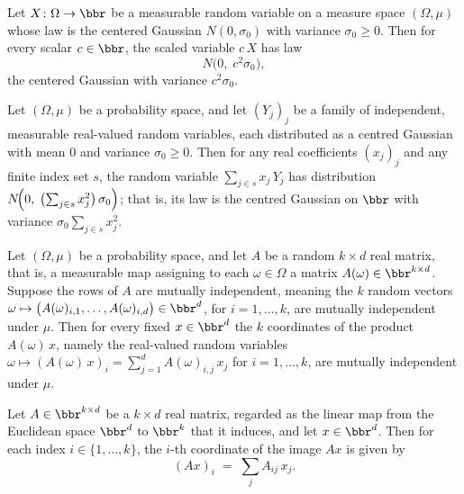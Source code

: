 \begin{lemma}
\label{map_const_mul_gaussian}
\leanok
{}
Let $X\colon \Omega \to \bbr$ be a measurable random variable on a measure space
$(\Omega, \mu)$ whose law is the centered Gaussian $N(0, \sigma_0)$ with variance
$\sigma_0 \ge 0$. Then for every scalar $c \in \bbr$, the scaled variable $c\,X$ has law
\[
  N\!\bigl(0,\; c^2 \sigma_0\bigr),
\]
the centered Gaussian with variance $c^2 \sigma_0$.
\end{lemma}

\begin{lemma}
\label{sum_scaled_iid_gaussian_map}
\leanok
{}
Let $(\Omega,\mu)$ be a probability space, and let $(Y_j)_{j}$ be a family of
independent, measurable real-valued random variables, each distributed as a centred
Gaussian with mean $0$ and variance $\sigma_0 \ge 0$. Then for any real coefficients
$(x_j)_j$ and any finite index set $s$, the random variable $\sum_{j \in s} x_j\, Y_j$
has distribution $N\!\Bigl(0,\; \bigl(\sum_{j \in s} x_j^2\bigr)\,\sigma_0\Bigr)$; that
is, its law is the centred Gaussian on $\bbr$ with variance $\sigma_0 \sum_{j \in s}
x_j^2$.
\end{lemma}

\begin{lemma}
\label{rows_indep}
\leanok
{}
Let $(\Omega,\mu)$ be a probability space, and let $A$ be a random $k\times d$ real
matrix, that is, a measurable map assigning to each $\omega\in\Omega$ a matrix
$A(\omega)\in\bbr^{k\times d}$. Suppose the rows of $A$ are mutually independent,
meaning the $k$ random vectors
$\omega\mapsto\bigl(A(\omega)_{i,1},\dots,A(\omega)_{i,d}\bigr)\in\bbr^{d}$, for
$i=1,\dots,k$, are mutually independent under $\mu$. Then for every fixed $x\in\bbr^{d}$
the $k$ coordinates of the product $A(\omega)\,x$, namely the real-valued random
variables $\omega\mapsto (A(\omega)\,x)_i=\sum_{j=1}^{d}A(\omega)_{i,j}\,x_j$ for
$i=1,\dots,k$, are mutually independent under $\mu$.
\end{lemma}

\begin{lemma}
\label{toEuclideanLin_apply_eq_sum}
\leanok
{}
Let $A\in\bbr^{k\times d}$ be a $k\times d$ real matrix, regarded as the linear map from
the Euclidean space $\bbr^{d}$ to $\bbr^{k}$ that it induces, and let $x\in\bbr^{d}$.
Then for each index $i\in\{1,\dots,k\}$, the $i$-th coordinate of the image $Ax$ is
given by
\[
  (Ax)_i \;=\; \sum_{j} A_{ij}\,x_j .
\]
\end{lemma}

